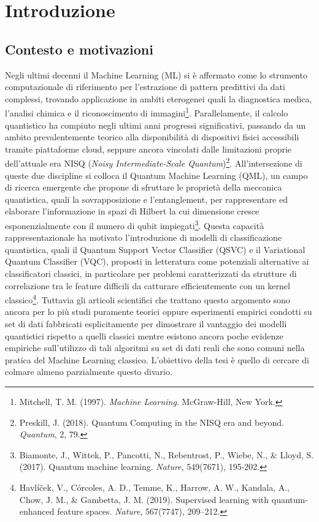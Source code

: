 \chapter*{Introduzione}

\section*{Contesto e motivazioni}

Negli ultimi decenni il Machine Learning (ML) si è affermato come lo strumento computazionale di riferimento per l'estrazione di pattern predittivi da dati complessi, trovando applicazione in ambiti eterogenei quali la diagnostica medica, l'analisi chimica e il riconoscimento di immagini\footnote{Mitchell, T. M. (1997). \textit{Machine Learning}. McGraw-Hill, New York.}. Parallelamente, il calcolo quantistico ha compiuto negli ultimi anni progressi significativi, passando da un ambito prevalentemente teorico alla disponibilità di dispositivi fisici accessibili tramite piattaforme cloud, seppure ancora vincolati dalle limitazioni proprie dell'attuale era NISQ (\textit{Noisy Intermediate-Scale Quantum})\footnote{Preskill, J. (2018). Quantum Computing in the NISQ era and beyond. \textit{Quantum}, 2, 79.}.
All'intersezione di queste due discipline si colloca il Quantum Machine Learning (QML), un campo di ricerca emergente che propone di sfruttare le proprietà della meccanica quantistica, quali la sovrapposizione e l'entanglement, per rappresentare ed elaborare l'informazione in spazi di Hilbert la cui dimensione cresce esponenzialmente con il numero di qubit impiegati\footnote{Biamonte, J., Wittek, P., Pancotti, N., Rebentrost, P., Wiebe, N., \& Lloyd, S. (2017). Quantum machine learning. \textit{Nature}, 549(7671), 195-202.}. Questa capacità rappresentazionale ha motivato l'introduzione di modelli di classificazione quantistica, quali il Quantum Support Vector Classifier (QSVC) e il Variational Quantum Classifier (VQC), proposti in letteratura come potenziali alternative ai classificatori classici, in particolare per problemi caratterizzati da strutture di correlazione tra le feature difficili da catturare efficientemente con un kernel classico\footnote{Havlíček, V., Córcoles, A. D., Temme, K., Harrow, A. W., Kandala, A., Chow, J. M., \& Gambetta, J. M. (2019). Supervised learning with quantum-enhanced feature spaces. \textit{Nature}, 567(7747), 209--212.}.
Tuttavia gli articoli scientifici che trattano questo argomento sono ancora per lo più studi puramente teorici oppure esperimenti empirici condotti su set di dati fabbricati esplicitamente per dimostrare il vantaggio dei modelli quantistici rispetto a quelli classici mentre esistono ancora poche evidenze empiriche sull'utilizzo di tali algoritmi su set di dati reali che sono comuni nella pratica del Machine Learning classico. L'obiettivo della tesi è quello di cercare di colmare almeno parzialmente questo divario.

